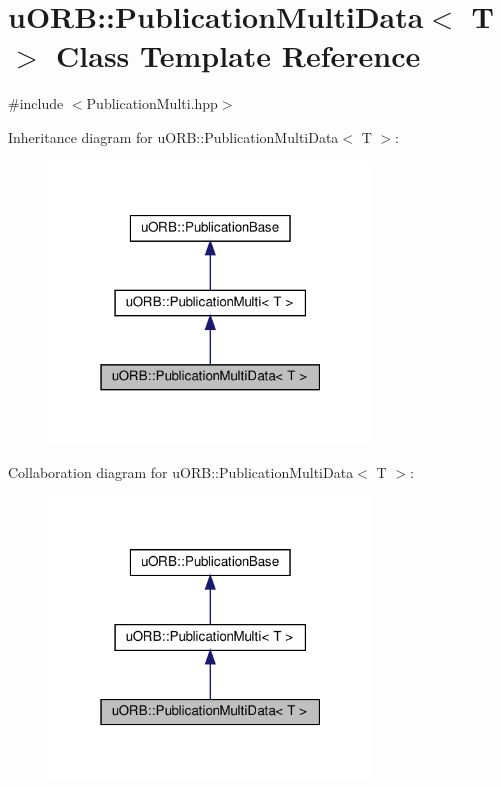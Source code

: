 \hypertarget{classuORB_1_1PublicationMultiData}{}\section{u\+O\+RB\+:\+:Publication\+Multi\+Data$<$ T $>$ Class Template Reference}
\label{classuORB_1_1PublicationMultiData}


{\ttfamily \#include $<$Publication\+Multi.\+hpp$>$}



Inheritance diagram for u\+O\+RB\+:\+:Publication\+Multi\+Data$<$ T $>$\+:\nopagebreak
\begin{figure}[H]
\begin{center}
\leavevmode
\includegraphics[width=244pt]{d6/da8/classuORB_1_1PublicationMultiData__inherit__graph}
\end{center}
\end{figure}


Collaboration diagram for u\+O\+RB\+:\+:Publication\+Multi\+Data$<$ T $>$\+:\nopagebreak
\begin{figure}[H]
\begin{center}
\leavevmode
\includegraphics[width=244pt]{d5/d2e/classuORB_1_1PublicationMultiData__coll__graph}
\end{center}
\end{figure}
